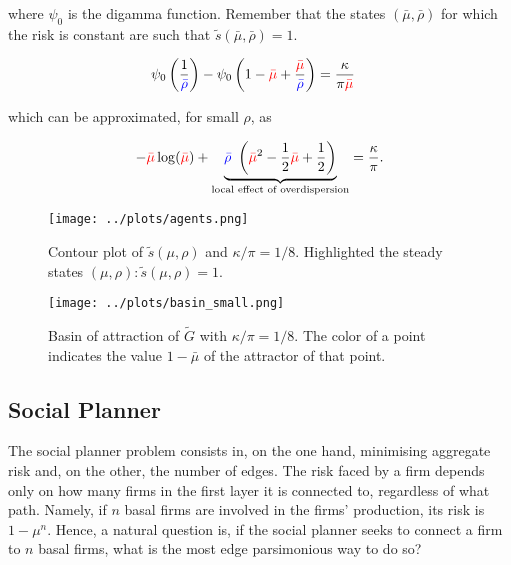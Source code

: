 \documentclass[american, abstract=on]{scrartcl}
\theoremstyle{plain}
\begin{document}
where $\psi_0$ is the digamma function. Remember that the states $(\bar{\mu}, \bar{\rho})$ for which the risk is constant are such that $\tilde{s}(\bar{\mu}, \bar{\rho})= 1$.

\begin{equation}
  \begin{split}
    \psi_0\left(\frac{1}{\textcolor{blue}{\bar{\rho}}} \right) - \psi_0\left(1 - \textcolor{red}{\bar{\mu}} + \frac{ \textcolor{red}{\bar{\mu}} }{\textcolor{blue}{\bar{\rho}}} \right) &= \frac{\kappa}{\pi \textcolor{red}{\bar{\mu}}}
  \end{split}
\end{equation}

which can be approximated, for small $\rho$, as

\begin{equation}
   - \textcolor{red}{\bar{\mu}}\log(\textcolor{red}{\bar{\mu}}) + \underbrace{\textcolor{blue}{\bar{\rho}} \ \left(\textcolor{red}{\bar{\mu}}^2 - \frac{1}{2}\textcolor{red}{\bar{\mu}} + \frac{1}{2}\right)}_{\text{local effect of overdispersion}} = \frac{\kappa}{\pi}.
\end{equation}

\begin{figure}[H]
  \centering
  \texttt{[image: ../plots/agents.png]}
  \caption{Contour plot of $\tilde{s}(\mu, \rho)$ and $\kappa / \pi = 1 / 8$. Highlighted the steady states $(\mu, \rho): \tilde{s}(\mu, \rho) = 1$.}
  \label{fig:agents-optimum}
\end{figure}

\begin{figure}[H]
  \centering
  \texttt{[image: ../plots/basin\_small.png]}
  \caption{Basin of attraction of $\tilde{G}$ with $\kappa / \pi = 1 / 8$. The color of a point indicates the value $1 - \bar{\mu}$ of the attractor of that point.}
  \label{fig:basin-plot}
\end{figure}


\subsection{Social Planner}

The social planner problem consists in, on the one hand, minimising aggregate risk and, on the other, the number of edges. The risk faced by a firm depends only on how many firms in the first layer it is connected to, regardless of what path. Namely, if $n$ basal firms are involved in the firms' production, its risk is $1 - \mu^n$. Hence, a natural question is, if the social planner seeks to connect a firm to $n$ basal firms, what is the most edge parsimonious way to do so? 
\end{document}
